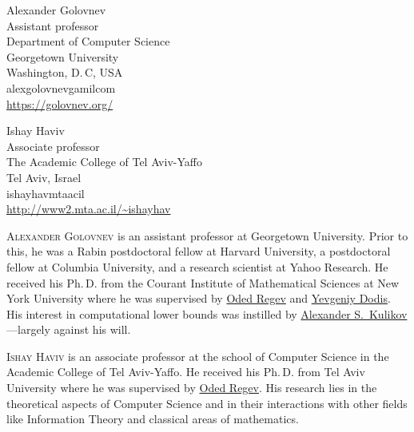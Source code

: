 \documentclass{toc}
\begin{document}
%
%
%
%
%
\begin{tocauthors}
\begin{tocinfo}[golovnev]
 Alexander Golovnev\\
 Assistant professor\\
 Department of Computer Science\\
 Georgetown University\\
 Washington, D.\,C, USA\\
 alexgolovnev\tocat{}gamil\tocdot{}com\\
 \url{https://golovnev.org/}
\end{tocinfo}
\begin{tocinfo}[haviv]
  Ishay Haviv\\
  Associate professor\\
  The Academic College of Tel Aviv-Yaffo\\
  Tel Aviv, Israel\\
  ishayhav\tocat{}mta\tocdot{}ac\tocdot{}il \\
  \url{http://www2.mta.ac.il/~ishayhav}
\end{tocinfo}
\end{tocauthors}

%
%
%
%
%
%
%
%
%
%
%
%
%
%
%
%
%
%
%
%
\begin{tocaboutauthors}
\begin{tocabout}[golovnev]  %
  \textsc{Alexander Golovnev} is an assistant professor at Georgetown University.  Prior to this,  he was a Rabin postdoctoral fellow at Harvard University,  a postdoctoral fellow at Columbia University,  and a research scientist at Yahoo Research.  He received his Ph.\,D. from the Courant Institute of Mathematical Sciences at New York University where he was supervised by \href{http://cims.nyu.edu/~regev/}{Oded Regev} and \href{https://cs.nyu.edu/~dodis/}{Yevgeniy Dodis}.  His interest in computational lower bounds was instilled by \href{https://alexanderskulikov.github.io/}{Alexander S.~Kulikov}---largely against his will.
%
%
\end{tocabout}
\begin{tocabout}[haviv]
\textsc{Ishay Haviv} is an associate professor at the school of Computer Science in the Academic College of Tel Aviv-Yaffo.
He received his Ph.\,D. from Tel Aviv University where he was supervised by \href{http://cims.nyu.edu/~regev/}{Oded Regev}. His research lies in the theoretical aspects of Computer Science and in their interactions with other fields like Information Theory and %
%
classical areas of mathematics.  %
\end{tocabout}
\end{tocaboutauthors}
\end{document}
